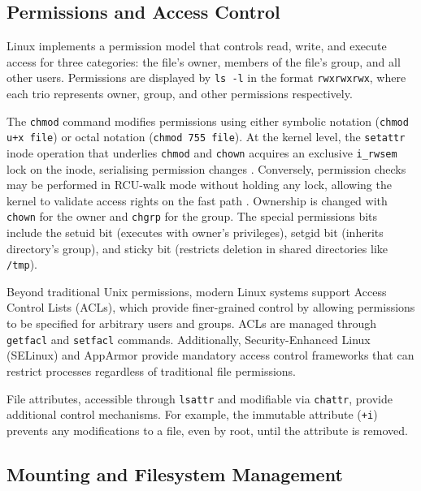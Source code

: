 \subsection{Permissions and Access Control}
\label{PermissionsAndACL}

Linux implements a permission model that controls read, write, and execute access for three categories: the file's owner, members of the file's group, and all other users. Permissions are displayed by \texttt{ls -l} in the format \texttt{rwxrwxrwx}, where each trio represents owner, group, and other permissions respectively.

The \texttt{chmod} command modifies permissions using either symbolic notation (\texttt{chmod u+x file}) or octal notation (\texttt{chmod 755 file}). At the kernel level, the \texttt{setattr} inode operation that underlies \texttt{chmod} and \texttt{chown} acquires an exclusive \texttt{i\_rwsem} lock on the inode, serialising permission changes \parencite{KernelFSLocking}. Conversely, permission checks may be performed in RCU-walk mode without holding any lock, allowing the kernel to validate access rights on the fast path \parencite{KernelFSLocking}. Ownership is changed with \texttt{chown} for the owner and \texttt{chgrp} for the group. The special permissions bits include the setuid bit (executes with owner's privileges), setgid bit (inherits directory's group), and sticky bit (restricts deletion in shared directories like \texttt{/tmp}).

Beyond traditional Unix permissions, modern Linux systems support Access Control Lists (ACLs), which provide finer-grained control by allowing permissions to be specified for arbitrary users and groups. ACLs are managed through \texttt{getfacl} and \texttt{setfacl} commands. Additionally, Security-Enhanced Linux (SELinux) and AppArmor provide mandatory access control frameworks that can restrict processes regardless of traditional file permissions.

File attributes, accessible through \texttt{lsattr} and modifiable via \texttt{chattr}, provide additional control mechanisms. For example, the immutable attribute (\texttt{+i}) prevents any modifications to a file, even by root, until the attribute is removed.

\subsection{Mounting and Filesystem Management}
\label{MountingFilesystems}

